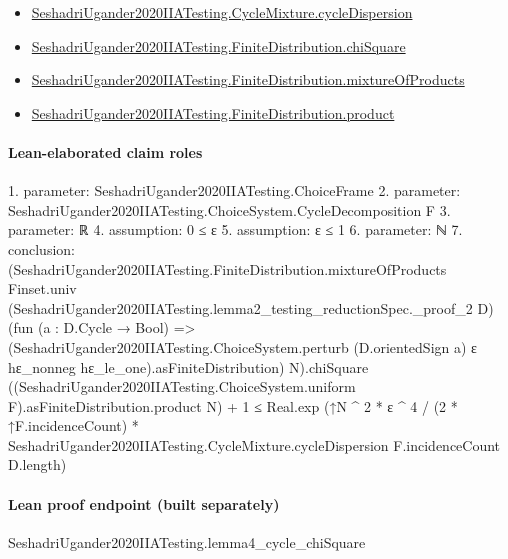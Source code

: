 \documentclass[10pt]{article}
\begin{document}
\begin{itemize}
\item \hyperlink{paper-prerequisite-d1b6db8e571d96c2}{Seshadri\allowbreak{}Ugander2020\allowbreak{}IIA\allowbreak{}Testing.\allowbreak{}Cycle\allowbreak{}Mixture.\allowbreak{}cycle\allowbreak{}Dispersion}
\item \hyperlink{governing-declaration-d61b96c7277f5786}{Seshadri\allowbreak{}Ugander2020\allowbreak{}IIA\allowbreak{}Testing.\allowbreak{}Finite\allowbreak{}Distribution.\allowbreak{}chi\allowbreak{}Square}
\item \hyperlink{paper-prerequisite-4cbb8978d5ced12b}{Seshadri\allowbreak{}Ugander2020\allowbreak{}IIA\allowbreak{}Testing.\allowbreak{}Finite\allowbreak{}Distribution.\allowbreak{}mixture\allowbreak{}Of\allowbreak{}Products}
\item \hyperlink{governing-declaration-5fac9c490551d2cc}{Seshadri\allowbreak{}Ugander2020\allowbreak{}IIA\allowbreak{}Testing.\allowbreak{}Finite\allowbreak{}Distribution.\allowbreak{}product}
\end{itemize}
\paragraph{Lean-elaborated claim roles}\begin{ReviewVerbatim}
1. parameter: SeshadriUgander2020IIATesting.ChoiceFrame
2. parameter: SeshadriUgander2020IIATesting.ChoiceSystem.CycleDecomposition F
3. parameter: ℝ
4. assumption: 0 ≤ ε
5. assumption: ε ≤ 1
6. parameter: ℕ
7. conclusion: (SeshadriUgander2020IIATesting.FiniteDistribution.mixtureOfProducts Finset.univ
          (SeshadriUgander2020IIATesting.lemma2_testing_reductionSpec._proof_2 D)
          (fun (a : D.Cycle → Bool) =>
            (SeshadriUgander2020IIATesting.ChoiceSystem.perturb (D.orientedSign a) ε hε_nonneg
                hε_le_one).asFiniteDistribution)
          N).chiSquare
      ((SeshadriUgander2020IIATesting.ChoiceSystem.uniform F).asFiniteDistribution.product N) +
    1 ≤
  Real.exp
    (↑N ^ 2 * ε ^ 4 / (2 * ↑F.incidenceCount) *
      SeshadriUgander2020IIATesting.CycleMixture.cycleDispersion F.incidenceCount D.length)
\end{ReviewVerbatim}

\paragraph{Lean proof endpoint (built separately)}\begin{ReviewVerbatim}
SeshadriUgander2020IIATesting.lemma4_cycle_chiSquare
\end{ReviewVerbatim}
\end{document}

